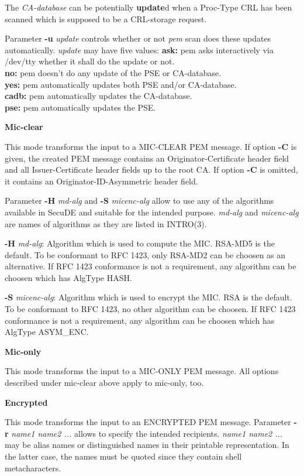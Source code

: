 The {\em CA-database} can be potentially {\bf update}d when a Proc-Type CRL has been scanned
which is supposed to be a CRL-storage request.

Parameter {\bf -u} {\em update} controls whether or not {\em pem} scan does these updates automatically. 
{\em update} may have five values:
\bvtab
{\bf ask:}  \2 pem asks interactively via /dev/tty whether it shall do the update or not. \\
{\bf no:}   \2 pem doesn't do any update of the PSE or CA-database. \\
{\bf yes:}  \2 pem automatically updates both PSE and/or CA-database. \\
{\bf cadb:} \2 pem automatically updates the CA-database. \\
{\bf pse:}  \2 pem automatically updates the PSE. \\
\evtab

{\large\bf Mic-clear}

This mode transforms the input to a MIC-CLEAR PEM message. If option {\bf -C} is given, the created
PEM message contains an Originator-Certificate header field and all Issuer-Certificate header fields
up to the root CA. If option {\bf -C} is omitted, it contains an Originator-ID-Asymmetric header
field.

Parameter {\bf -H} {\em md-alg} and {\bf -S} {\em micenc-alg}
allow to use any of the algorithms available in SecuDE and suitable
for the intended purpose. {\em md-alg} and {\em micenc-alg}
are names of algorithms as they are listed in INTRO(3).

{\bf -H} {\em md-alg}: Algorithm which is used to compute the MIC. RSA-MD5 is the default.
To be conformant to RFC 1423, only RSA-MD2 can be choosen as an alternative. If RFC 1423
conformance is not a requirement, any algorithm can be choosen which has AlgType HASH.

{\bf -S} {\em micenc-alg}: Algorithm which is used to encrypt the MIC. RSA is the default.
To be conformant to RFC 1423, no other algorithm can be choosen. If RFC 1423
conformance is not a requirement, any algorithm can be choosen which has AlgType ASYM\_ENC.

{\large\bf Mic-only}

This mode transforms the input to a MIC-ONLY PEM message. All options described under mic-clear
above apply to mic-only, too.

{\large\bf Encrypted}

This mode transforms the input to an ENCRYPTED PEM message. Parameter {\bf -r} {\em name1 name2 
...}
allows to specify the intended recipients. {\em name1 name2 ...} may be alias names or distinguished
names in their printable representation. In the latter case, the names must be quoted since they
contain shell metacharacters.

